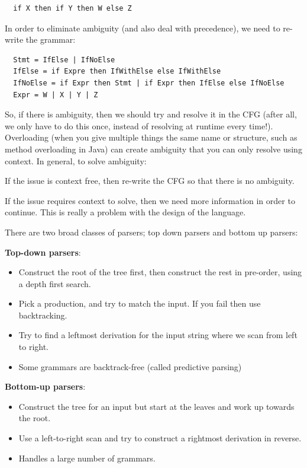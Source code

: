\begin{verbatim}
  if X then if Y then W else Z
\end{verbatim}

In order to eliminate ambiguity (and also deal with precedence), we need to re-
write the grammar:

\begin{verbatim}
  Stmt = IfElse | IfNoElse
  IfElse = if Expre then IfWithElse else IfWithElse
  IfNoElse = if Expr then Stmt | if Expr then IfElse else IfNoElse
  Expr = W | X | Y | Z
\end{verbatim}

So, if there is ambiguity, then we should try and resolve it in the CFG (after
all, we only have to do this once, instead of resolving at runtime every time!).
Overloading (when you give multiple things the same name or structure, such as
method overloading in Java) can create ambiguity that you can only resolve using
context. In general, to solve ambiguity:

\begin{description}
  \item If the issue is context free, then re-write the CFG so that there is no
  ambiguity.
  \item If the issue requires context to solve, then we need more information
  in order to continue. This is really a problem with the design of the
  language.
\end{description}

There are two broad classes of parsers; top down parsers and bottom up parsers:

\begin{description}
  \item \textbf{Top-down parsers}:\\
    \begin{itemize}
      \item Construct the root of the tree first, then construct the rest in
      pre-order, using a depth first search.
      \item Pick a production, and try to match the input. If you fail then use
      backtracking.
      \item Try to find a leftmost derivation for the input string where we scan
      from left to right.
      \item Some grammars are backtrack-free (called predictive parsing)
    \end{itemize}
  \item \textbf{Bottom-up parsers}:\\
    \begin{itemize}
      \item Construct the tree for an input but start at the leaves and work up
      towards the root.
      \item Use a left-to-right scan and try to construct a rightmost derivation
      in reverse.
      \item Handles a large number of grammars.
    \end{itemize}
\end{description}

